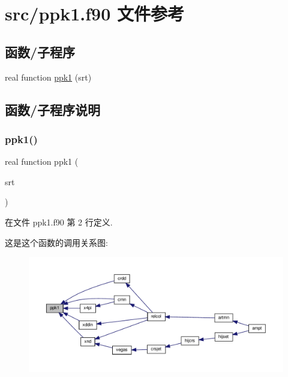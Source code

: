 \hypertarget{ppk1_8f90}{}\section{src/ppk1.f90 文件参考}
\label{ppk1_8f90}
\subsection*{函数/子程序}
\begin{DoxyCompactItemize}
\item 
real function \mbox{\hyperlink{ppk1_8f90_afc6f58e4cb32502de4d9ed7b08dc6f31}{ppk1}} (srt)
\end{DoxyCompactItemize}


\subsection{函数/子程序说明}
\mbox{\label{ppk1_8f90_afc6f58e4cb32502de4d9ed7b08dc6f31}} 
\subsubsection{\texorpdfstring{ppk1()}{ppk1()}}
{\footnotesize\ttfamily real function ppk1 (\begin{DoxyParamCaption}\item[{}]{srt }\end{DoxyParamCaption})}



在文件 ppk1.\+f90 第 2 行定义.

这是这个函数的调用关系图\+:
\nopagebreak
\begin{figure}[H]
\begin{center}
\leavevmode
\includegraphics[width=350pt]{ppk1_8f90_afc6f58e4cb32502de4d9ed7b08dc6f31_icgraph}
\end{center}
\end{figure}
